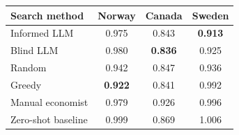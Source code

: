 \begin{tabular}{lccc}
\toprule
Search method & Norway & Canada & Sweden \\
\midrule
Informed LLM & 0.975 & 0.843 & \textbf{0.913} \\
Blind LLM & 0.980 & \textbf{0.836} & 0.925 \\
Random & 0.942 & 0.847 & 0.936 \\
Greedy & \textbf{0.922} & 0.841 & 0.992 \\
Manual economist & 0.979 & 0.926 & 0.996 \\
\midrule
Zero-shot baseline & 0.999 & 0.869 & 1.006 \\
\bottomrule
\end{tabular}
